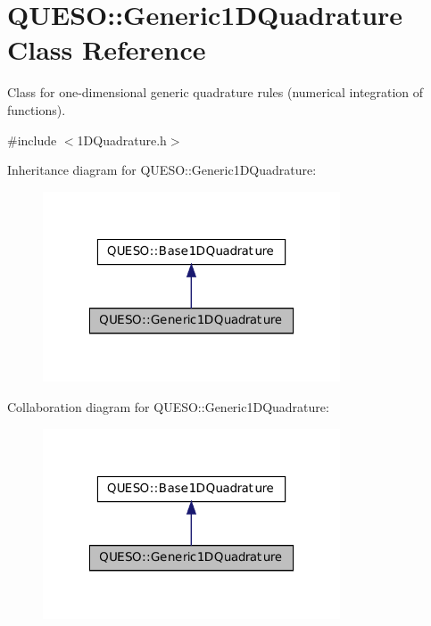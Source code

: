 \hypertarget{class_q_u_e_s_o_1_1_generic1_d_quadrature}{\section{Q\-U\-E\-S\-O\-:\-:Generic1\-D\-Quadrature Class Reference}
\label{class_q_u_e_s_o_1_1_generic1_d_quadrature}
}


Class for one-\/dimensional generic quadrature rules (numerical integration of functions).  




{\ttfamily \#include $<$1\-D\-Quadrature.\-h$>$}



Inheritance diagram for Q\-U\-E\-S\-O\-:\-:Generic1\-D\-Quadrature\-:
\nopagebreak
\begin{figure}[H]
\begin{center}
\leavevmode
\includegraphics[width=250pt]{class_q_u_e_s_o_1_1_generic1_d_quadrature__inherit__graph}
\end{center}
\end{figure}


Collaboration diagram for Q\-U\-E\-S\-O\-:\-:Generic1\-D\-Quadrature\-:
\nopagebreak
\begin{figure}[H]
\begin{center}
\leavevmode
\includegraphics[width=250pt]{class_q_u_e_s_o_1_1_generic1_d_quadrature__coll__graph}
\end{center}
\end{figure}
